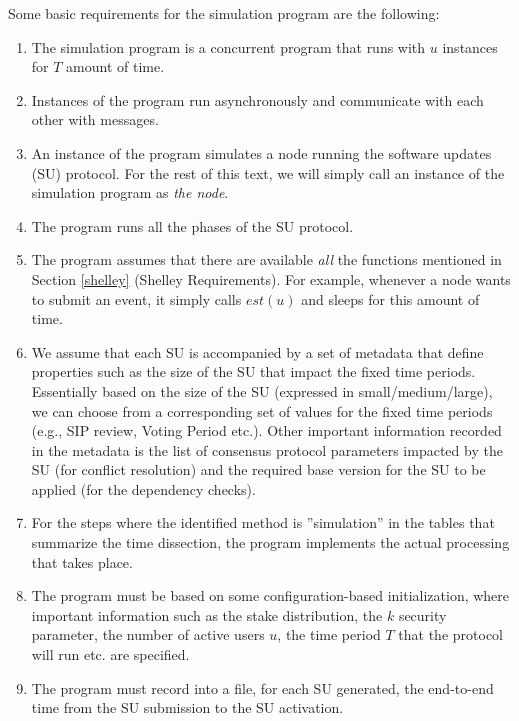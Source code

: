 Some basic requirements for the simulation program are the following:
\begin{enumerate}
\item The simulation program is a concurrent program that runs with $u$ instances for $T$ amount of time.
\item Instances of the program run asynchronously and communicate with each other with messages.
\item An instance of the program simulates a node running the software updates (SU) protocol. For the rest of this text, we will simply call an instance of the simulation program as \emph{the node}.
\item The program runs all the phases of the SU protocol.
\item The program assumes that there are available \emph{all} the functions mentioned in Section \ref{shelley} (Shelley Requirements). For example, whenever a node wants to submit an event, it simply calls $est(u)$ and sleeps for this amount of time.
\item We assume that each SU is accompanied by a set of metadata that define properties such as the size of the SU that impact the fixed time periods. Essentially based on the size of the SU (expressed in small/medium/large), we can choose from a corresponding set of values for the fixed time periods (e.g., SIP review, Voting Period etc.). Other important information recorded in the metadata is the list of consensus protocol parameters impacted by the SU (for conflict resolution) and the required base version for the SU to be applied (for the dependency checks).
\item For the steps where the identified method is ''simulation'' in the tables that summarize the time dissection, the program implements the actual processing that takes place.
\item The program must be based on some configuration-based initialization, where important information such as the stake distribution, the $k$ security parameter, the number of active users $u$, the time period $T$ that the protocol will run etc. are specified.
\item The program must record into a file, for each SU generated, the end-to-end time from the SU submission to the SU activation.
\end{enumerate}
